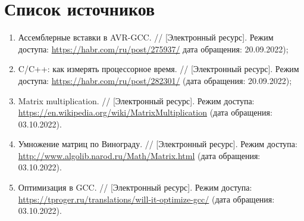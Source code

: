 %



\section*{\large Список источников}
\begin{enumerate}
	\item Ассемблерные вставки в AVR-GCC. // [Электронный ресурс]. Режим доступа: \url{https://habr.com/ru/post/275937/} дата обращения: 20.09.2022); \label{bib:1}
	\item C/C++: как измерять процессорное время. // [Электронный ресурс]. Режим доступа: \url{https://habr.com/ru/post/282301/} (дата обращения: 20.09.2022);\label{bib:2}
	\item Matrix multiplication. // [Электронный ресурс]. Режим доступа: 
	\url{https://en.wikipedia.org/wiki/MatrixMultiplication} (дата обращения: 03.10.2022).\label{bib:3}
	\item Умножение матриц по Винограду. // [Электронный ресурс]. Режим доступа: \url{http://www.algolib.narod.ru/Math/Matrix.html} (дата обращения: 03.10.2022). \label{bib:4}
	\item Оптимизация в GCC. // [Электронный ресурс]. Режим доступа: \url{https://tproger.ru/translations/will-it-optimize-gcc/} (дата обращения: 03.10.2022). \label{bib:5}
\end{enumerate}